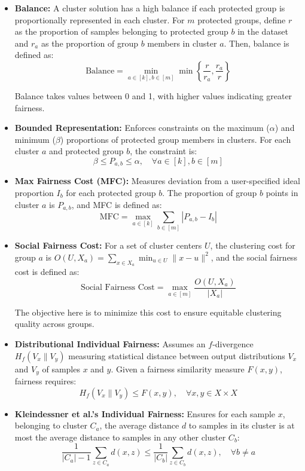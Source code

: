 \begin{itemize}

\item \textbf{Balance:} A cluster solution has a high balance if each protected group is proportionally represented in each cluster. For \(m\) protected groups, define \(r\) as the proportion of samples belonging to protected group \(b\) in the dataset and \(r_a\) as the proportion of group \(b\) members in cluster \(a\). Then, balance is defined as:
\[
\text{Balance} = \min_{a\in [k], b\in [m]} \min\left\{\frac{r}{r_a}, \frac{r_a}{r}\right\}
\]

Balance takes values between 0 and 1, with higher values indicating greater fairness.

\item \textbf{Bounded Representation:} Enforces constraints on the maximum (\(\alpha\)) and minimum (\(\beta\)) proportions of protected group members in clusters. For each cluster \(a\) and protected group \(b\), the constraint is:
\[
\beta \leq P_{a,b} \leq \alpha, \quad \forall a\in [k], b\in [m]
\]

\item \textbf{Max Fairness Cost (MFC):} Measures deviation from a user-specified ideal proportion \(I_b\) for each protected group \(b\). The proportion of group \(b\) points in cluster \(a\) is \(P_{a,b}\), and MFC is defined as:
\[
\text{MFC} = \max_{a\in [k]} \sum_{b\in [m]} |P_{a,b} - I_b|
\]

\item \textbf{Social Fairness Cost:} For a set of cluster centers \(U\), the clustering cost for group \(a\) is \(O(U, X_a) = \sum_{x \in X_a} \min_{u \in U}\|x - u\|^2\), and the social fairness cost is defined as:
\[
\text{Social Fairness Cost} = \max_{a \in [m]} \frac{O(U, X_a)}{|X_a|}
\]

The objective here is to minimize this cost to ensure equitable clustering quality across groups.

\item \textbf{Distributional Individual Fairness:} Assumes an \(f\)-divergence \(H_f(V_x \| V_y)\) measuring statistical distance between output distributions \(V_x\) and \(V_y\) of samples \(x\) and \(y\). Given a fairness similarity measure \(F(x,y)\), fairness requires:
\[
H_f(V_x \| V_y) \leq F(x,y), \quad \forall x,y \in X \times X
\]

\item \textbf{Kleindessner et al.'s Individual Fairness:} Ensures for each sample \(x\), belonging to cluster \(C_a\), the average distance \(d\) to samples in its cluster is at most the average distance to samples in any other cluster \(C_b\):
\[
\frac{1}{|C_a| - 1}\sum_{z \in C_a} d(x,z) \leq \frac{1}{|C_b|}\sum_{z \in C_b} d(x,z), \quad \forall b \neq a
\]


\end{itemize}
